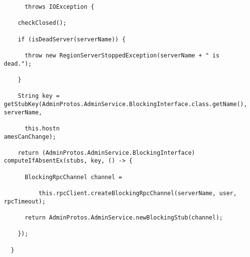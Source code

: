 \documentclass{report}%
\begin{document}
\begin{enumerate}
\begin{lstlisting}
      throws IOException {

    checkClosed();

    if (isDeadServer(serverName)) {

      throw new RegionServerStoppedException(serverName + " is dead.");

    }

    String key = getStubKey(AdminProtos.AdminService.BlockingInterface.class.getName(), serverName,

      this.hostn
amesCanChange);

    return (AdminProtos.AdminService.BlockingInterface) computeIfAbsentEx(stubs, key, () -> {

      BlockingRpcChannel channel =

          this.rpcClient.createBlockingRpcChannel(serverName, user, rpcTimeout);

      return AdminProtos.AdminService.newBlockingStub(channel);

    });

  }


\end{lstlisting}
\end{enumerate}
\end{document}
